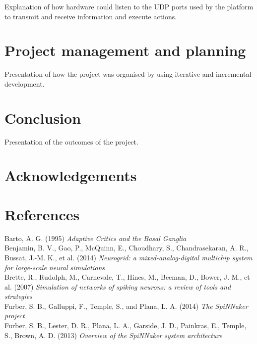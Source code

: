 \documentclass[10pt]{article}
\begin{document}
    Explanation of how hardware could listen to the UDP ports used by the platform to transmit and receive information and execute actions.

    \section{Project management and planning}

    Presentation of how the project was organised by using iterative and incremental development.
    
    \section{Conclusion}

    Presentation of the outcomes of the project.

    \section*{Acknowledgements}
    
    \onecolumn
    \newpage
    
    \section*{References}

    Barto, A. G. (1995) \textit{Adaptive Critics and the Basal Ganglia} \\[-3pt]

    \noindent
    Benjamin, B. V., Gao, P., McQuinn, E., Choudhary, S., Chandrasekaran, A. R., Bussat, J.-M. K., et al. (2014) \textit{ Neurogrid: a mixed-analog-digital multichip system for large-scale neural simulations} \\[-3pt]

    \noindent 
    Brette, R., Rudolph, M., Carnevale, T., Hines, M., Beeman, D., Bower, J. M., et al. (2007) \textit{ Simulation of networks of spiking neurons: a review of tools and strategies} \\[-3pt]

    \noindent    
    Furber, S. B., Galluppi, F., Temple, S., and Plana, L. A. (2014) \textit{The SpiNNaker project} \\[-3pt]
    
    \noindent    
    Furber, S. B., Lester, D. R., Plana, L. A., Garside, J. D., Painkras, E., Temple, S., Brown, A. D. (2013) \textit{Overview of the SpiNNaker system architecture} \\[-3pt]
\end{document}
